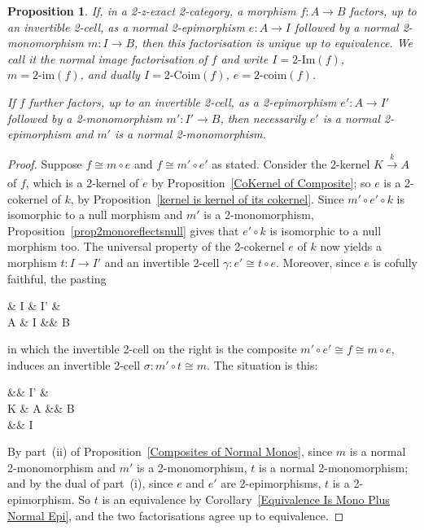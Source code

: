 \documentclass[reqno,a4paper]{amsart}
\numberwithin{equation}{section}
\theoremstyle{plain}
\newtheorem{proposition}[subsection]{Proposition}
\theoremstyle{definition}
\def\nameit#1{\textrm{#1}~}
\def\prox{\nameit{Proposition}}
\def\corx{\nameit{Corollary}}
\def\dfn#1{{\itshape #1}}
\newcommand{\comp}{\circ}
\newcommand{\iso}{\cong}
\renewcommand{\1}{\onecat{1}}
\newcommand{\TwoImg}{\ensuremath{2\text{-}\mathrm{Im}}}
\newcommand{\twoimg}{\ensuremath{2\text{-}\mathrm{im}}}
\newcommand{\TwoCoim}{\ensuremath{2\text{-}\mathrm{Coim}}}
\newcommand{\twocoim}{\ensuremath{2\text{-}\mathrm{coim}}}
\newcommand{\aar}[2][]{\xrightarrow[#1]{#2}}
\begin{document}
\begin{proposition}\label{Image Factorisation of Normal Map is Unique}
	If, in a 2-z-exact 2-category, a morphism \(f\colon A\to B\) factors, up to an invertible 2-cell, as a normal 2-epimorphism \(e\colon A\to I\) followed by a normal 2-monomorphism \(m\colon I\to B\), then this factorisation is unique up to equivalence. We call it the \dfn{normal image factorisation} of \(f\) and write \(I=\TwoImg(f)\), \(m=\twoimg(f)\), and dually \(I=\TwoCoim(f)\), \(e=\twocoim(f)\).

	If \(f\) further factors, up to an invertible 2-cell, as a 2-epimorphism \(e'\colon A\to I'\) followed by a 2-monomorphism \(m'\colon I'\to B\), then necessarily \(e'\) is a normal 2-epimorphism and \(m'\) is a normal 2-monomorphism.
\end{proposition}
\begin{proof}
	Suppose \(f\iso m\comp e\) and \(f\iso m'\comp e'\) as stated. Consider the 2-kernel \(K\aar{k}A\) of \(f\), which is a 2-kernel of \(e\) by \prox\ref{CoKernel of Composite}; so \(e\) is a 2-cokernel of \(k\), by \prox\ref{kernel is kernel of its cokernel}. Since \(m'\comp e'\comp k\) is isomorphic to a null morphism and \(m'\) is a 2-monomorphism, \prox\ref{prop2monoreflectsnull} gives that \(e'\comp k\) is isomorphic to a null morphism too. The universal property of the 2-cokernel \(e\) of \(k\) now yields a morphism \(t\colon I\to I'\) and an invertible 2-cell \(\gamma\colon e'\iso t\comp e\). Moreover, since \(e\) is cofully faithful, the pasting
	\begin{cd}
		\& I \& {I'} \& \\
		A \& I \&\& B \text{,}
		\arrow["t", from=1-2, to=1-3]
		\arrow["{\gamma^{-1}}"{inner sep=1ex}, xshift = -2ex,shift right=6, iso, from=1-2, to=1-3]
		\arrow["{m'}", from=1-3, to=2-4]
		\arrow["e", from=2-1, to=1-2]
		\arrow["{e'}"{description},bend right=15, from=2-1, to=1-3]
		\arrow["e"', from=2-1, to=2-2]
		\arrow["m"', from=2-2, to=2-4]
		\arrow[shift left=5, iso, from=2-2, to=2-4]
	\end{cd}
	in which the invertible 2-cell on the right is the composite \(m'\comp e'\iso f\iso m\comp e\), induces an invertible 2-cell \(\sigma\colon m'\comp t\iso m\). The situation is this:
	\begin{cd}[4]
		\&\& {I'} \& \\
		K \& A \&\& B \\
		\&\& I
		\arrow["{m'}",tail, from=1-3, to=2-4]
		\arrow["k", from=2-1, to=2-2,nmono]
		\arrow["{e'}", two heads,from=2-2, to=1-3]
		\arrow["\gamma"'{inner sep=1ex}, iso,from=2-2, to=2-4,xshift =-4ex]
		\arrow["\sigma"'{inner sep=1ex}, iso, from=2-2, to=2-4,xshift =4ex]
		\arrow["e"', from=2-2, to=3-3,nepi]
		\arrow["t"{description}, from=3-3, to=1-3]
		\arrow["m"', from=3-3, to=2-4,nmono]
	\end{cd}
	By part~\textup{(ii)} of \prox\ref{Composites of Normal Monos}, since \(m\) is a normal 2-monomorphism and \(m'\) is a 2-monomorphism, \(t\) is a normal 2-monomorphism; and by the dual of part~\textup{(i)}, since \(e\) and \(e'\) are 2-epimorphisms, \(t\) is a 2-epimorphism. So \(t\) is an equivalence by \corx\ref{Equivalence Is Mono Plus Normal Epi}, and the two factorisations agree up to equivalence.


\end{proof}
\end{document}

